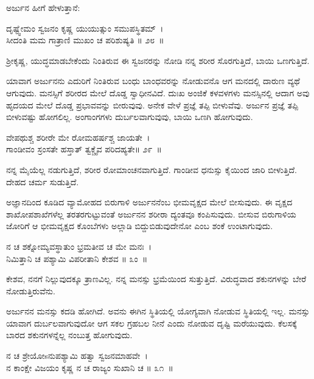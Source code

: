 ಅರ್ಜುನ ಹೀಗೆ ಹೇಳುತ್ತಾನೆ:

\begin{shloka}
ದೃಷ್ಟ್ವೇಮಂ ಸ್ವಜನಂ ಕೃಷ್ಣ ಯುಯುತ್ಸುಂ ಸಮುಪಸ್ಥಿತಮ್~।\\ಸೀದಂತಿ ಮಮ ಗಾತ್ರಾಣಿ ಮುಖಂ ಚ ಪರಿಶುಷ್ಯತಿ \hfill॥ ೨೮~॥
\end{shloka}

\begin{artha}
ಶ‍್ರೀಕೃಷ್ಣ, ಯುದ್ಧಮಾಡಬೇಕೆಂದು ನಿಂತಿರುವ ಈ ಸ್ವಜನರನ್ನು ನೋಡಿ ನನ್ನ ಶರೀರ ಸೊರಗುತ್ತಿದೆ, ಬಾಯಿ ಒಣಗುತ್ತಿದೆ.
\end{artha}

ಯಾವಾಗ ಅರ್ಜುನನು ಎದುರಿಗೆ ನಿಂತಿರುವ ಬಂಧು ಬಾಂಧವರನ್ನು ನೋಡುವನೊ ಆಗ ಮನದಲ್ಲಿ ದಾರುಣ ವ್ಯಥೆ ಆಗುವುದು. ಮನಸ್ಸಿಗೆ ಶರೀರದ ಮೇಲೆ ದೊಡ್ಡ ಸ್ವಾಧೀನವಿದೆ. ದುಃಖ ಅಂಜಿಕೆ ಕಳವಳಗಳು ಮನಸ್ಸಿನಲ್ಲಿ ಆದಾಗ ಅವು ಹೃದಯದ ಮೇಲೆ ದೊಡ್ಡ ಪ್ರಭಾವವನ್ನು ಬೀರುವುವು. ಅನೇಕ ವೇಳೆ ಪ್ರಜ್ಞೆ ತಪ್ಪಿ ಬೀಳುವೆವು. ಅರ್ಜುನ ಪ್ರಜ್ಞೆ ತಪ್ಪಿ ಬೀಳುವಷ್ಟು ಹೋಗಲಿಲ್ಲ. ಅಂಗಾಂಗಗಳು ದುರ್ಬಲವಾಗುವುವು, ಬಾಯಿ ಒಣಗಿ ಹೋಗುವುದು.

\begin{shloka}
ವೇಪಥುಶ್ಚ ಶರೀರೇ ಮೇ ರೋಮಹರ್ಷಶ್ಚ ಜಾಯತೇ~।\\ಗಾಂಡೀವಂ ಸ್ರಂಸತೇ ಹಸ್ತಾತ್ ತ್ವಕ್ಚೈವ ಪರಿದಹ್ಯತೇ\hfill॥ ೨೯~॥
\end{shloka}

\begin{artha}
ನನ್ನ ಮೈಯೆಲ್ಲ ನಡುಗುತ್ತಿದೆ, ಶರೀರ ರೋಮಾಂಚನವಾಗುತ್ತಿದೆ. ಗಾಂಡೀವ ಧನುಸ್ಸು ಕೈಯಿಂದ ಜಾರಿ ಬೀಳುತ್ತಿದೆ. ದೇಹದ ಚರ್ಮ ಸುಡುತ್ತಿದೆ.
\end{artha}

ಅಜ್ಞಾನದಿಂದ ಕೂಡಿದ ವ್ಯಾಮೋಹದ ಬಿರುಗಾಳಿ ಅರ್ಜುನನೆಂಬ ಭೀಮವೃಕ್ಷದ ಮೇಲೆ ಬೀಸುವುದು. ಈ ವೃಕ್ಷದ ಶಾಖೋಪಶಾಖೆಗಳೆಲ್ಲ ತರತರಗುಟ್ಟುವಂತೆ ಅರ್ಜುನನ ಶರೀರಾ ದ್ಯಂತವೂ ಕಂಪಿಸುವುದು. ಬೀಸುವ ಬಿರುಗಾಳಿಯ ಜೋರಿಗೆ ಆ ಭೀಮವೃಕ್ಷದ ಕೊಂಬೆಗಳು ಅಲ್ಲಾಡಿ ಬಿದ್ದುಬಿಡುವುದೇನೋ ಎಂಬ ಶಂಕೆ ಉಂಟಾಗುವುದು.

\begin{shloka}
ನ ಚ ಶಕ್ನೋಮ್ಯವಸ್ಥಾತುಂ ಭ್ರಮತೀವ ಚ ಮೇ ಮನಃ~।\\ನಿಮಿತ್ತಾನಿ ಚ ಪಶ್ಯಾಮಿ ವಿಪರೀತಾನಿ ಕೇಶವ \hfill॥ ೩ಂ~॥
\end{shloka}

\begin{artha}
ಕೇಶವ, ನನಗೆ ನಿಲ್ಲುವುದಕ್ಕೂ ತ್ರಾಣವಿಲ್ಲ. ನನ್ನ ಮನಸ್ಸು ಭ್ರಮೆಯಿಂದ ಸುತ್ತುತ್ತಿದೆ. ವಿರುದ್ಧವಾದ ಶಕುನಗಳನ್ನು ಬೇರೆ ನೋಡುತ್ತಿರುವೆನು.
\end{artha}

ಅರ್ಜುನನ ಮನಸ್ಸು ಕದಡಿ ಹೋಗಿದೆ. ಅವನು ಈಗಿನ ಸ್ಥಿತಿಯಲ್ಲಿ ಯೋಗ್ಯವಾಗಿ ನೋಡುವ ಸ್ಥಿತಿಯಲ್ಲಿ ಇಲ್ಲ. ಮನಸ್ಸು ಯಾವಾಗ ದುರ್ಬಲವಾಗುವುದೋ ಆಗ ಸಕಲ ಗ್ರಹಬಲ ನೀನೆ ಎಂದು ನೋಡುವ ದೃಷ್ಟಿ ಮರೆಯುವುದು. ಕೆಲಸಕ್ಕೆ ಬಾರದ ಶಕುನಗಳನ್ನೆಲ್ಲ ನಂಬುತ್ತ ಹೋಗುವುದು.

\begin{shloka}
ನ ಚ ಶ್ರೇಯೋsನುಪಶ್ಯಾಮಿ ಹತ್ವಾ ಸ್ವಜನಮಾಹವೇ~।\\ನ ಕಾಂಕ್ಷೇ ವಿಜಯಂ ಕೃಷ್ಣ ನ ಚ ರಾಜ್ಯಂ ಸುಖಾನಿ ಚ \hfill॥ ೩೧~॥
\end{shloka}

